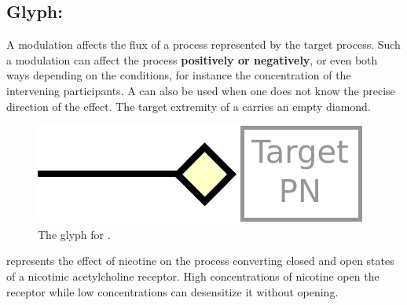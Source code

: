 \subsection{Glyph: }\label{sec:modulation}

A modulation affects the flux of a process represented by the target process. Such a modulation can affect the
process \textbf{positively or negatively}, or even both ways depending on the conditions, for instance the concentration of the intervening
participants. A  can also be used when one does not know the precise direction of the effect. The target extremity of a  carries an empty diamond.

\begin{figure}[H]
  \centering
  \includegraphics[scale = 0.5]{images/modulation}
  \caption{The \PD glyph for .}
  \label{fig:modulation}
\end{figure}

 represents the effect of nicotine on the process converting closed and open states of a nicotinic acetylcholine receptor. High concentrations of nicotine open the receptor while low concentrations can desensitize it without opening. 

